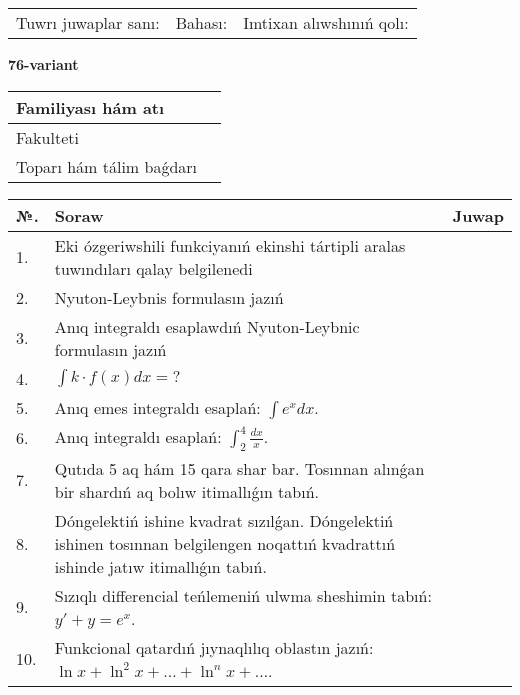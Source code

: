 \documentclass{article}
\begin{document}
\vspace{1cm}

\begin{tabular}{ c c c }
Tuwrı juwaplar sanı: \underline{\hspace{2cm}} & Bahası: \underline{\hspace{2cm}} & Imtixan alıwshınıń qolı: \underline{\hspace{2cm}} \\
\end{tabular}

\newpage

\begin{center}\textbf{76-variant}\end{center}

\bgroup
\def\arraystretch{1.5}
\begin{tabular}{ |m{6cm}|m{10cm}| }
  \hline
  Familiyası hám atı & \\
  \hline
  Fakulteti &\\
  \hline
  Toparı hám tálim baǵdarı & \\
  \hline
\end{tabular}
\egroup

\vspace{0.5cm}

\bgroup
\def\arraystretch{2}
\begin{tabular}{ |l|m{8cm}|m{7cm}| }
  \hline
  №. & Soraw & Juwap \\
  \hline
  1. & Eki ózgeriwshili funkciyanıń ekinshi tártipli aralas tuwındıları qalay belgilenedi &  \\
  \hline
  2. & Nyuton-Leybnis formulasın jazıń &  \\
  \hline
  3. & Anıq integraldı esaplawdıń Nyuton-Leybnic formulasın jazıń &  \\
  \hline
  4. & $\displaystyle\int k \cdot f(x)dx = ?$ &  \\
  \hline
  5. & Anıq emes integraldı esaplań: $\displaystyle\int e^{x}dx$. &  \\
  \hline
  6. & Anıq integraldı esaplań: $\displaystyle\int_{2}^{4}\frac{dx}{x}$. &  \\
  \hline
  7. & Qutıda 5 aq hám 15 qara shar bar. Tosınnan alınǵan bir shardıń aq bolıw itimallıǵın tabıń. &  \\
  \hline
  8. & Dóngelektiń ishine kvadrat sızılǵan. Dóngelektiń ishinen tosınnan belgilengen noqattıń kvadrattıń ishinde jatıw itimallıǵın tabıń. &  \\
  \hline
  9. & Sızıqlı differencial teńlemeniń ulwma sheshimin tabıń: $y' + y =e^{x}$. &  \\
  \hline
  10. & Funkcional qatardıń jıynaqlılıq oblastın jazıń: $\ln x + \ln^{2}x + \ldots + \ln^{n}x + \ldots$. &  \\
  \hline
\end{tabular}
\egroup
\end{document}
